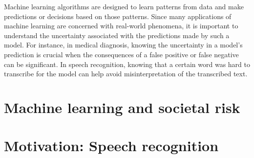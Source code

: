 Machine learning algorithms are designed to learn patterns from data and make predictions or decisions based on those patterns. Since many applications of machine learning are concerned with real-world phenomena, it is important to understand the uncertainty associated with the predictions made by such a model. For instance, in medical diagnosis, knowing the uncertainty in a model's prediction is crucial when the consequences of a false positive or false negative can be significant. In speech recognition, knowing that a certain word was hard to transcribe for the model can help avoid misinterpretation of the transcribed text.






\section{Machine learning and societal risk}
\cite{europeancommission_briefing_2021}


\section{Motivation: Speech recognition}


